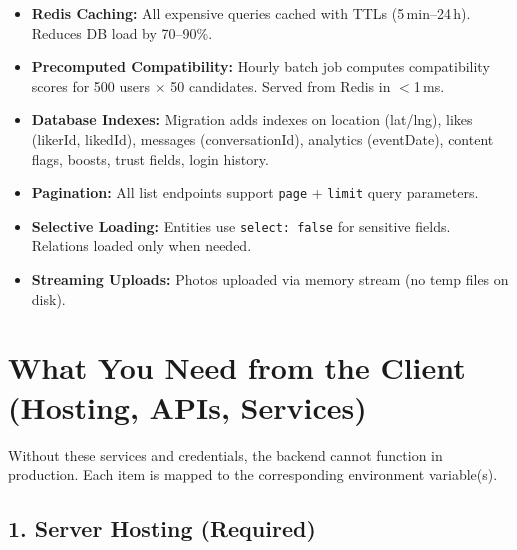 \documentclass[a4paper,11pt]{article}
\begin{document}
\begin{itemize}[leftmargin=1.5em]
    \item \textbf{Redis Caching:} All expensive queries cached with TTLs (5\,min--24\,h). Reduces DB load by 70--90\%.
    \item \textbf{Precomputed Compatibility:} Hourly batch job computes compatibility scores for 500 users $\times$ 50 candidates. Served from Redis in $<$1\,ms.
    \item \textbf{Database Indexes:} Migration adds indexes on location (lat/lng), likes (likerId, likedId), messages (conversationId), analytics (eventDate), content flags, boosts, trust fields, login history.
    \item \textbf{Pagination:} All list endpoints support \texttt{page} + \texttt{limit} query parameters.
    \item \textbf{Selective Loading:} Entities use \texttt{select: false} for sensitive fields. Relations loaded only when needed.
    \item \textbf{Streaming Uploads:} Photos uploaded via memory stream (no temp files on disk).
\end{itemize}


\newpage
\section{What You Need from the Client (Hosting, APIs, Services)}

\begin{warnbox}
Without these services and credentials, the backend cannot function in production. Each item is mapped to the corresponding environment variable(s).
\end{warnbox}

\subsection{1. Server Hosting (Required)}
\end{document}
